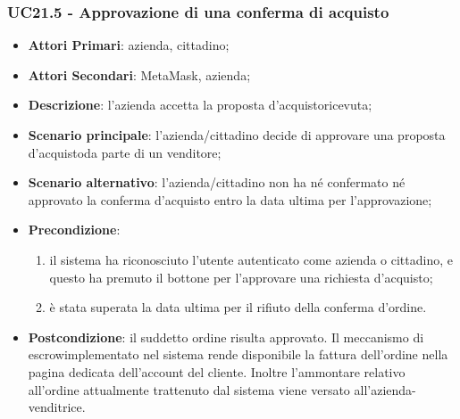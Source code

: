 \subsubsection{UC21.5 - Approvazione di una conferma di acquisto}
\begin{itemize}
	\item \textbf{Attori Primari}: azienda, cittadino;
	\item \textbf{Attori Secondari}: MetaMask\glo, azienda;
	\item \textbf{Descrizione}: l'azienda accetta la proposta d'acquisto\glosp ricevuta;
	\item \textbf{Scenario principale}: l'azienda/cittadino decide di approvare una proposta d'acquisto\glosp da parte di un venditore;
	\item \textbf{Scenario alternativo}: l'azienda/cittadino non ha né confermato né approvato la conferma d'acquisto entro la data ultima per l'approvazione;

	\item \textbf{Precondizione}: 
	\begin{enumerate}[label=\alph*.]
		\item il sistema ha riconosciuto l'utente autenticato come azienda o cittadino, e questo ha premuto il bottone per l'approvare una richiesta d'acquisto;
		\item è stata superata la data ultima per il rifiuto della conferma d'ordine\glo.
	\end{enumerate}
	\item \textbf{Postcondizione}: il suddetto ordine risulta approvato. Il meccanismo di escrow\glosp implementato nel sistema rende disponibile la fattura dell'ordine nella pagina dedicata dell'account del cliente. Inoltre l'ammontare relativo all'ordine attualmente trattenuto dal sistema viene versato all'azienda-venditrice.
\end{itemize}


